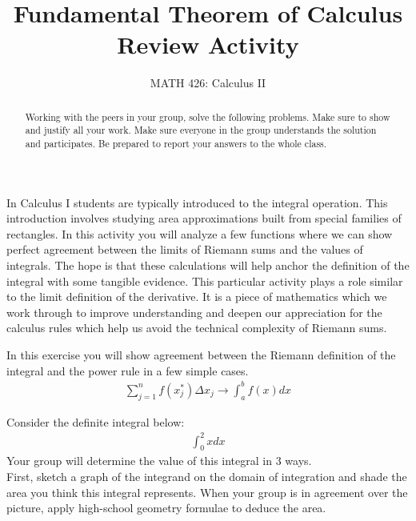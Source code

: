 \documentclass{ximera}
\title{Fundamental Theorem of Calculus Review Activity}
\author{MATH 426: Calculus II}
\begin{document}
\begin{abstract}
   Working with the peers in your group, solve the following problems. Make sure to show and justify all your work. Make sure everyone in the group understands the solution and participates. Be prepared to report your answers to the whole class. 
\end{abstract}
\maketitle


In Calculus I students are typically introduced to the integral operation. This introduction involves studying area approximations built from special families of rectangles. In this activity you will analyze a few functions where we can show perfect agreement between the limits of Riemann sums and the values of integrals. The hope is that these calculations will help anchor the definition of the integral with some tangible evidence. This particular activity plays a role similar to the limit definition of the derivative. It is a piece of mathematics which we work through to improve understanding and deepen our appreciation for the calculus rules which help us avoid the technical complexity of Riemann sums.

\begin{exercise}
In this exercise you will show agreement between the Riemann definition of the integral and the power rule in a few simple cases. 
\begin{align}
	\sum_{j=1}^n f(x^*_{j})\Delta x_{j} \rightarrow \int_{a}^b f(x) dx \nonumber
\end{align}

Consider the definite integral below:
\begin{align}
	\int_{0}^2 x dx \nonumber
\end{align}
Your group will determine the value of this integral in 3 ways.\\
First, sketch a graph of the integrand on the domain of integration and shade the area you think this integral represents. When your group is in agreement over the picture, apply high-school geometry formulae to deduce the area.
\end{exercise}
\end{document}
